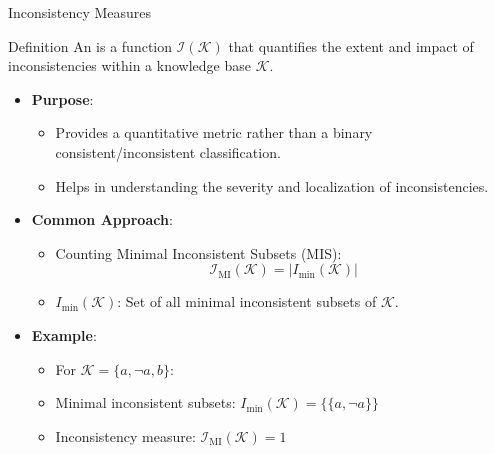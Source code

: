 \begin{frame}{Inconsistency Measures}
    \begin{block}{Definition}
        An  is a function \( \mathcal{I}(\mathcal{K}) \) that quantifies the extent and impact of inconsistencies within a knowledge base \( \mathcal{K} \).
    \end{block}
    \begin{itemize}
        \item \textbf{Purpose}:
              \begin{itemize}
                  \item Provides a quantitative metric rather than a binary consistent/inconsistent classification.
                  \item Helps in understanding the severity and localization of inconsistencies.
              \end{itemize}
        \item \textbf{Common Approach}:
              \begin{itemize}
                  \item Counting Minimal Inconsistent Subsets (MIS):
                        \[
                            \mathcal{I}_{\text{MI}}(\mathcal{K}) = \left| I_{\min}(\mathcal{K}) \right|
                        \]
                  \item \( I_{\min}(\mathcal{K}) \): Set of all minimal inconsistent subsets of \( \mathcal{K} \).
              \end{itemize}
        \item \textbf{Example}:
              \begin{itemize}
                  \item For \( \mathcal{K} = \{ a, \neg a, b \} \):
                  \item Minimal inconsistent subsets: \( I_{\min}(\mathcal{K}) = \{ \{ a, \neg a \} \} \)
                  \item Inconsistency measure: \( \mathcal{I}_{\text{MI}}(\mathcal{K}) = 1 \)
              \end{itemize}
    \end{itemize}
\end{frame}

